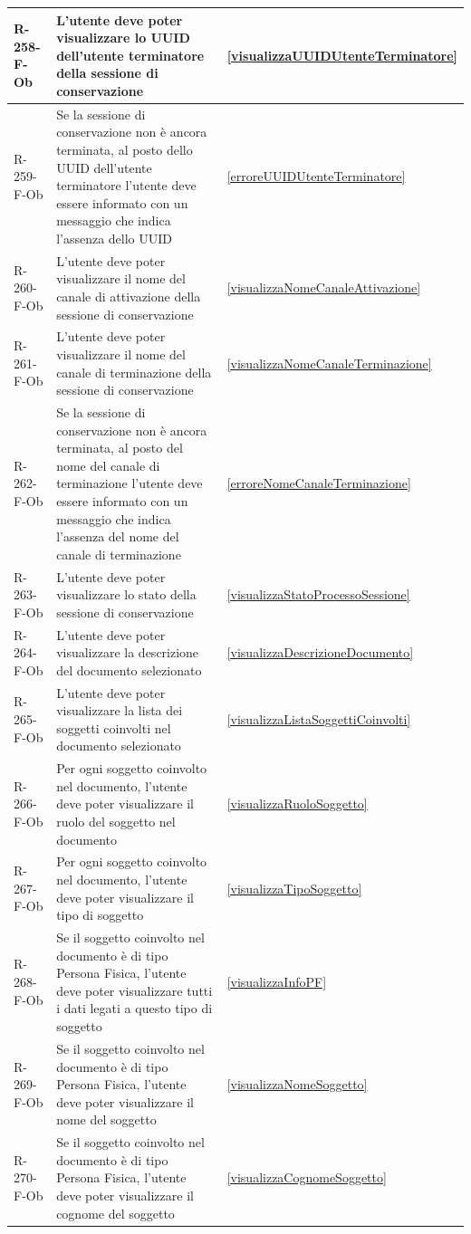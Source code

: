 \begin{longtable}{|p{2.5cm}|p{9.5cm}|p{2.5cm}|}
\hline
R-258-F-Ob & L'utente deve poter visualizzare lo UUID dell'utente terminatore della sessione di conservazione & \ref{visualizzaUUIDUtenteTerminatore} \\
\hline
R-259-F-Ob & Se la sessione di conservazione non è ancora terminata, al posto dello UUID dell'utente terminatore l'utente deve essere informato con un messaggio che indica l'assenza dello UUID & \ref{erroreUUIDUtenteTerminatore} \\
\hline
R-260-F-Ob & L'utente deve poter visualizzare il nome del canale di attivazione della sessione di conservazione & \ref{visualizzaNomeCanaleAttivazione} \\
\hline
R-261-F-Ob & L'utente deve poter visualizzare il nome del canale di terminazione della sessione di conservazione & \ref{visualizzaNomeCanaleTerminazione} \\
\hline
R-262-F-Ob & Se la sessione di conservazione non è ancora terminata, al posto del nome del canale di terminazione l'utente deve essere informato con un messaggio che indica l'assenza del nome del canale di terminazione & \ref{erroreNomeCanaleTerminazione} \\
\hline
R-263-F-Ob & L'utente deve poter visualizzare lo stato della sessione di conservazione & \ref{visualizzaStatoProcessoSessione} \\
\hline
R-264-F-Ob & L'utente deve poter visualizzare la descrizione del documento selezionato & \ref{visualizzaDescrizioneDocumento} \\
\hline
R-265-F-Ob & L'utente deve poter visualizzare la lista dei soggetti coinvolti nel documento selezionato & \ref{visualizzaListaSoggettiCoinvolti} \\
\hline
R-266-F-Ob & Per ogni soggetto coinvolto nel documento, l'utente deve poter visualizzare il ruolo del soggetto nel documento & \ref{visualizzaRuoloSoggetto} \\
\hline
R-267-F-Ob & Per ogni soggetto coinvolto nel documento, l'utente deve poter visualizzare il tipo di soggetto & \ref{visualizzaTipoSoggetto} \\
\hline
R-268-F-Ob & Se il soggetto coinvolto nel documento è di tipo Persona Fisica, l'utente deve poter visualizzare tutti i dati legati a questo tipo di soggetto & \ref{visualizzaInfoPF} \\
\hline
R-269-F-Ob & Se il soggetto coinvolto nel documento è di tipo Persona Fisica, l'utente deve poter visualizzare il nome del soggetto & \ref{visualizzaNomeSoggetto} \\
\hline
R-270-F-Ob & Se il soggetto coinvolto nel documento è di tipo Persona Fisica, l'utente deve poter visualizzare il cognome del soggetto & \ref{visualizzaCognomeSoggetto} \\

\end{longtable}
